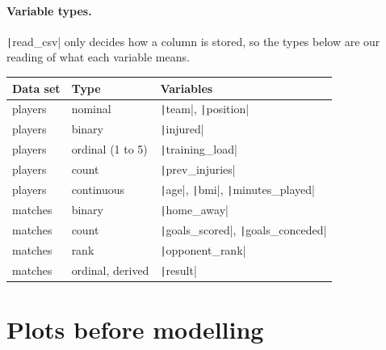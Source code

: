 \documentclass[12pt,notitlepage]{report}
\begin{document}
\paragraph{Variable types.}
\texttt|read_csv| only decides how a column is stored, so the types
below are our reading of what each variable means.

\begin{center}
  \begin{tabular}{lll}
    \toprule
    Data set & Type & Variables \\
    \midrule
    players & nominal          & \texttt|team|, \texttt|position| \\
    players & binary           & \texttt|injured| \\
    players & ordinal (1 to 5) & \texttt|training_load| \\
    players & count            & \texttt|prev_injuries| \\
    players & continuous       & \texttt|age|, \texttt|bmi|, \texttt|minutes_played| \\
    matches & binary           & \texttt|home_away| \\
    matches & count            & \texttt|goals_scored|, \texttt|goals_conceded| \\
    matches & rank             & \texttt|opponent_rank| \\
    matches & ordinal, derived & \texttt|result| \\
    \bottomrule
  \end{tabular}
\end{center}

\section{Plots before modelling}
\end{document}
